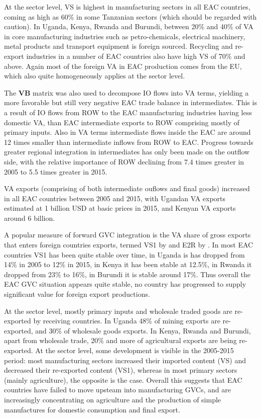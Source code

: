 \documentclass[a4paper]{article}
\begin{document}
 At the sector level, VS is highest in manufacturing sectors in all EAC countries, coming as high as 60\% in some Tanzanian sectors (which should be regarded with caution). In Uganda, Kenya, Rwanda and Burundi, between 20\% and 40\% of VA in core manufacturing industries such as petro-chemicals, electrical machinery, metal products and transport equipment is foreign sourced. Recycling and re-export industries in a number of EAC countries also have high VS of 70\% and above. Again most of the foreign VA in EAC production comes from the EU, which also quite homogeneously applies at the sector level. \newline
 
The \textbf{VB} matrix was also used to decompose IO flows into VA terms, yielding a more favorable but still very negative EAC trade balance in intermediates. This is a result of IO flows from ROW to the EAC manufacturing industries having less domestic VA, than EAC intermediate exports to ROW comprising mostly of primary inputs. Also in VA terms intermediate flows inside the EAC are around 12 times smaller than intermediate inflows from ROW to EAC. Progress towards greater regional integration in intermediates has only been made on the outflow side, with the relative
importance of ROW declining from 7.4 times greater in 2005 to 5.5 times greater in 2015. \newline 

VA exports (comprising of both intermediate ouflows and final goods) increased in all EAC countries between 2005 and 2015, with Ugandan VA exports estimated at 1 billion USD at basic prices in 2015, and Kenyan VA exports around 6 billion. \newline 

A popular measure of forward GVC integration is the VA share of gross exports that enters foreign countries exports, termed VS1 by \citet{hummels2001nature} and E2R by \citet{baldwin2015supply}. In most EAC countries VS1 has been quite stable over time, in Uganda is has dropped from 14\% in 2005 to 12\% in 2015, in Kenya it has been stable at 12.5\%, in Rwanda it dropped from 23\% to 16\%, in Burundi it is stable around 17\%. Thus overall the EAC GVC situation appears quite stable, no country has progressed to supply significant value for foreign export productions. \newline

At the sector level, mostly primary inputs and wholesale traded goods are re-exported by receiving countries. In Uganda 48\% of mining exports are re-exported, and 30\% of wholesale goods exports. In Kenya, Rwanda and Burundi, apart from wholesale trade, 20\% and more of agricultural exports are being re-exported. At the sector level, some development is visible in the 2005-2015 period: most manufacturing sectors increased their imported content (VS) and decreased their re-exported content (VS1), whereas in most primary sectors (mainly agriculture), the opposite is the case. Overall this suggests that EAC countries have failed to move upsteam into manufacturing GVCs, and are increasingly concentrating on agriculture and the production of simple manufactures for domestic consumption and final export. \newline
\end{document}
